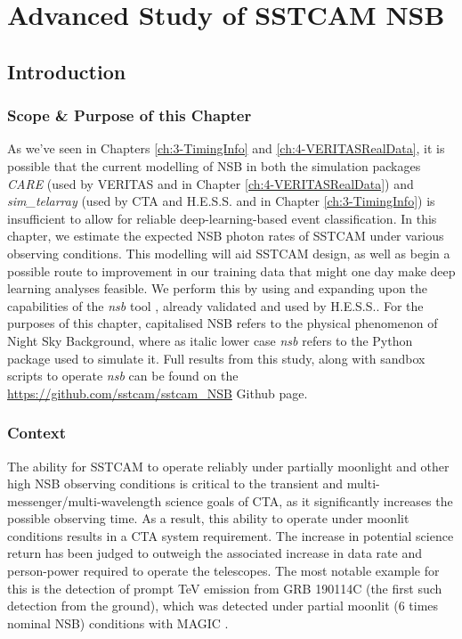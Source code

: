 \chapter{\label{ch:5-CHECNSB} Advanced Study of SSTCAM NSB}
\minitoc
\section{Introduction}
\label{sec:intro}

\subsection{Scope \& Purpose of this Chapter}
\label{sec:intro:scope}
As we've seen in Chapters \ref{ch:3-TimingInfo} and \ref{ch:4-VERITASRealData}, it is possible that the current modelling of NSB in both the simulation packages \textit{CARE} (used by VERITAS and in Chapter \ref{ch:4-VERITASRealData}) and \textit{sim\_telarray} (used by CTA and H.E.S.S. and in Chapter \ref{ch:3-TimingInfo}) is insufficient to allow for reliable deep-learning-based event classification. In this chapter, we estimate the expected NSB photon rates of SSTCAM under various observing conditions. This modelling will aid SSTCAM design, as well as begin a possible route to improvement in our training data that might one day make deep learning analyses feasible. We perform this by using and expanding upon the capabilities of the \textit{nsb} tool \cite{nsb}, already validated and used by H.E.S.S.. For the purposes of this chapter, capitalised NSB refers to the physical phenomenon of Night Sky Background, where as italic lower case \textit{nsb} refers to the Python package used to simulate it. Full results from this study, along with sandbox scripts to operate \textit{nsb} can be found on the \url{https://github.com/sstcam/sstcam_NSB} Github page. 

\subsection{Context}
\label{sec:intro:context}
The ability for SSTCAM to operate reliably under partially moonlight and other high NSB observing conditions is critical to the transient and multi-messenger/multi-wavelength science goals of CTA, as it significantly increases the possible observing time. As a result, this ability to operate under moonlit conditions results in a CTA system requirement. The increase in potential science return has been judged to outweigh the associated increase in data rate and person-power required to operate the telescopes. The most notable example for this is the detection of prompt TeV emission from GRB 190114C (the first such detection from the ground), which was detected under partial moonlit (6 times nominal NSB) conditions with MAGIC \cite{magicGRB}. 

